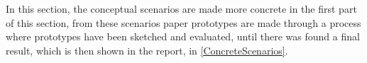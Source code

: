 In this section, the conceptual scenarios are made more concrete in the first part of this section, from these scenarios paper prototypes are made through a process where prototypes have been sketched and evaluated, until there was found a final result, which is then shown in the report, in \cref{ConcreteScenarios}.